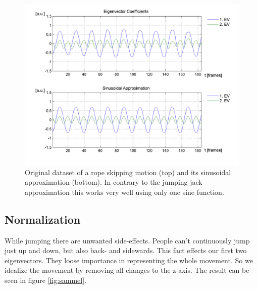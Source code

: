 \documentclass[a4paper]{article}
\begin{document}
\begin{figure}
		\centering
		\includegraphics[width=\textwidth]{1sinSeil.png}
		\caption{Original dataset of a rope skipping motion (top) and its sinusoidal approximation (bottom).
		In contrary to the jumping jack approximation this works very well using only one sine function.}
		\label{fig:approx3}
\end{figure}

\subsection{Normalization}
While jumping there are unwanted side-effects. People can't continuously jump just up and down, but also back- and sidewards. This fact effects our first two eigenvectors. They loose importance in representing the whole movement. So we idealize the movement by removing all changes to the z-axis. The result can be seen in figure \ref{fig:sammel}.

\end{document}
